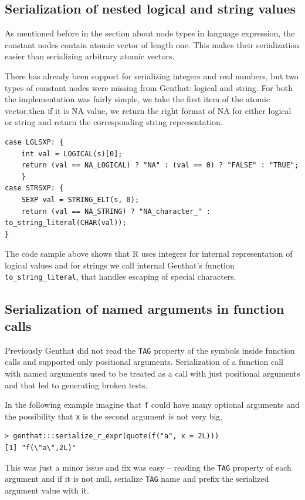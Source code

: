 \documentclass[thesis=B,english]{FITthesis}[2012/10/20]
\begin{document}
\subsection{Serialization of nested logical and string values}

As mentioned before in the section about node types in language expression, the constant nodes contain atomic vector of length one. This makes their serialization easier than serializing arbitrary atomic vectors.

There has already been support for serializing integers and real numbers, but two types of constant nodes were missing from Genthat: logical and string. For both the implementation was fairly simple, we take the first item of the atomic vector,then if it is NA value, we return the right format of NA for either logical or string and return the corresponding string representation.

\begin{verbatim}
case LGLSXP: {
    int val = LOGICAL(s)[0];
    return (val == NA_LOGICAL) ? "NA" : (val == 0) ? "FALSE" : "TRUE";
    }
case STRSXP: {
    SEXP val = STRING_ELT(s, 0);
    return (val == NA_STRING) ? "NA_character_" : to_string_literal(CHAR(val));
}
\end{verbatim}

The code sample above shows that R uses integers for internal representation of logical values and for strings we call internal Genthat’s function \verb|to_string_literal|, that handles escaping of special characters.


\subsection{Serialization of named arguments in function calls}
Previously Genthat did not read the \verb|TAG| property of the symbols inside function calls and supported only positional arguments. Serialization of a function call with named arguments used to be treated as a call with just positional arguments and that led to generating broken tests.

In the following example imagine that \verb|f| could have many optional arguments and the possibility that \verb|x| is the second argument is not very big. 


\begin{verbatim}
> genthat:::serialize_r_expr(quote(f("a", x = 2L)))
[1] "f(\"a\",2L)"
\end{verbatim}

This was just a minor issue and fix was easy – reading the \verb|TAG| property of each argument and if it is not null, serialize \verb|TAG| name and prefix the serialized argument value with it.
\end{document}
